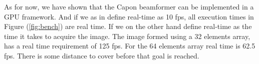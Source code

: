 \documentclass[conference]{IEEEtran}
\begin{document}
As for now, we have shown that the Capon beamformer can be implemented in a GPU framework. And if we as in \cite{Chen2011} define real-time as 10 fps, all execution times  in Figure (\ref{fig:bench}) are real time. If we on the other hand define real-time as the time it takes to acquire the image. The image formed using a 32 elements array, has a real time requirement of 125 fps. For the 64 elements array real time is 62.5 fps. There is some distance to cover before that goal is reached.



%
%



%
%
\end{document}
